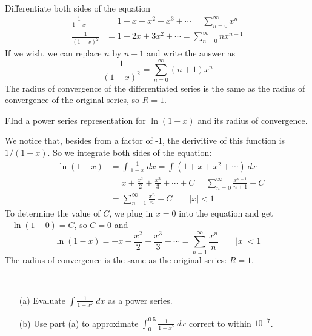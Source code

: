     \begin{solution}
      Differentiate both sides of the equation
      \begin{align*}
        \frac{1}{1-x} &= 1 + x + x^2 + x^3 + \cdots = \sum_{n=0}^{\infty} x^n \\
        \frac{1}{(1-x)^2} &= 1 + 2x + 3x^2 + \cdots = \sum_{n=0}^{\infty} nx^{n-1}
      \end{align*}
      If we wish, we can replace $n$ by $n+1$ and write the answer as
      $$  \frac{1}{(1-x)^2} = \sum_{n=0}^{\infty} (n+1) x^n $$
      The radius of convergence of the differentiated series is the same as the radius of convergence of the original series, so $R=1$.
    \end{solution}
    \begin{example}
      FInd a power series representation for $\ln (1-x)$ and its radius of convergence.
    \end{example}
    \begin{solution}
      We notice that, besides from a factor of -1, the derivitive of this function is $1/(1-x)$. So we integrate both sides of the equation:
      \begin{align*}
        -\ln (1-x) &= \int \frac{1}{1-x}\ dx = \int (1+x+x^2+\cdots)\ dx \\
        &= x + \frac{x^2}{2} + \frac{x^3}{3} + \cdots + C = \sum_{n=0}^{\infty} \frac{x^{n+1}}{n+1} + C \\
        &= \sum_{n=1}^{\infty} \frac{x^n}{n} + C  \qquad |x|<1
      \end{align*}
      To determine the value of $C$, we plug in $x=0$ into the equation and get $-\ln (1-0) = C$, so $C=0$ and
      $$ \ln (1-x) = -x - \frac{x^2}{2} - \frac{x^3}{3} - \cdots = \sum_{n=1}^{\infty} \frac{x^n}{n} \qquad |x|<1 $$
      The radius of convergence is the same as the original series: $R=1$.
    \end{solution}
    \begin{example}
      \hphantom{ }\\
      \begin{enumerate}
        \item[(a)] Evaluate $\displaystyle \int \frac{1}{1+x^7}\ dx$ as a power series.
        \item[(b)] Use part (a) to approximate $\displaystyle \int_{0}^{0.5} \frac{1}{1+x^7}\ dx$ correct to within $10^{-7}$.
      \end{enumerate}
    \end{example}
